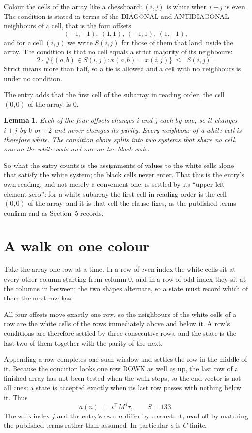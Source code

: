 \documentclass[11pt,a4paper]{article}
\theoremstyle{plain}
\newtheorem{lemma}[theorem]{Lemma}
\theoremstyle{definition}
\begin{document}
Colour the cells of the array like a chessboard: $(i,j)$ is white when $i+j$ is even. The
condition is stated in terms of the DIAGONAL and ANTIDIAGONAL neighbours of a cell, that is the
four offsets
\[
(-1,-1),\ (1,1),\ (-1,1),\ (1,-1),
\]
and for a cell $(i,j)$ we write $S(i,j)$ for those of them that land inside the array. The
condition is that no cell equals a strict majority of its neighbours:
\[
2\cdot\#\{(a,b)\in S(i,j) : x(a,b)=x(i,j)\}\;\le\;|S(i,j)| .
\]
Strict means more than half, so a tie is allowed and a cell with no neighbours is under no condition.

The entry adds that the first cell of the subarray in reading order, the cell $(0,0)$ of the array, is $0$.

\begin{lemma}\label{lem:split}
Each of the four offsets changes $i$ and $j$ each by one, so it changes $i+j$ by $0$ or $\pm2$
and never changes its parity. Every neighbour of a white cell is therefore white. The condition
above splits into two systems that share no cell: one on the white cells and one on the black
cells.
\end{lemma}

So what the entry counts is the assignments of values to the white cells alone that satisfy the
white system; the black cells never enter. That this is the entry's own reading, and not
merely a convenient one, is settled by its ``upper left element zero'': for a white subarray the
first cell in reading order is the cell $(0,0)$ of the array, and it is that cell the
clause fixes, as the published terms confirm and as Section~5 records.

\section{A walk on one colour}

Take the array one row at a time. In a row of even index the white cells sit at every other
column starting from column $0$, and in a row of odd index they sit at the columns in
between; the two shapes alternate, so a state must record which of them the next row has.

All four offsets move exactly one row, so the neighbours of the white cells of a row are the
white cells of the rows immediately above and below it. A row's conditions are therefore settled
by three consecutive rows, and the state is the last two of them together with the parity of the
next.

Appending a row completes one such window and settles the row in the middle of it. Because the
condition looks one row DOWN as well as up, the last row of a finished array has not been tested
when the walk stops, so the end vector is not all ones: a state is accepted exactly when its
last row passes with nothing below it. Thus
\[
a(n)\;=\;\iota^{\!\top}M^{\,j}\tau ,\qquad S=133.
\]
The walk index $j$ and the entry's own $n$ differ by a constant, read off by matching the
published terms rather than assumed. In particular $a$ is $C$-finite.
\end{document}
